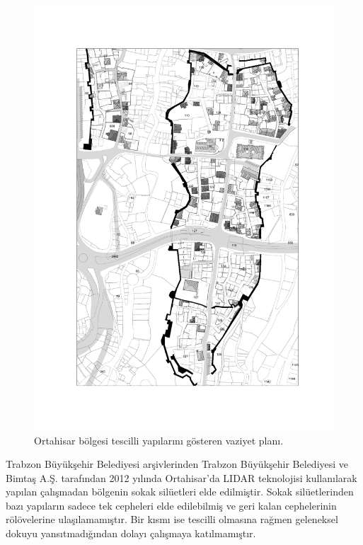 \documentclass[12pt,turkish,a4paperpaper,]{report}
\begin{document}
\begin{figure}
\centering
\includegraphics[width=1\textwidth,height=\textheight]{source/figures/vaziyetplanitescilli.pdf}
\caption{Ortahisar bölgesi tescilli yapılarını gösteren vaziyet planı.
\label{ortahisartescilli}}
\end{figure}

Trabzon Büyükşehir Belediyesi arşivlerinden Trabzon Büyükşehir
Belediyesi ve Bimtaş A.Ş. tarafından 2012 yılında Ortahisar'da LIDAR
teknolojisi kullanılarak yapılan çalışmadan bölgenin sokak silüetleri
elde edilmiştir. Sokak silüetlerinden bazı yapıların sadece tek
cepheleri elde edilebilmiş ve geri kalan cephelerinin rölövelerine
ulaşılamamıştır. Bir kısmı ise tescilli olmasına rağmen geleneksel
dokuyu yansıtmadığından dolayı çalışmaya katılmamıştır.
\end{document}
